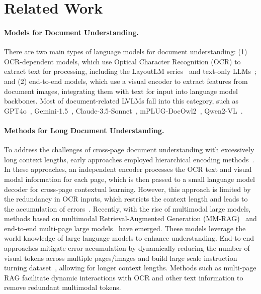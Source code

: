 \section{Related Work}
\label{sec:related_work}

\paragraph{Models for Document Understanding.}
There are two main types of language models for document understanding: (1) OCR-dependent models, which use Optical Character Recognition (OCR) to extract text for processing, including the LayoutLM series~\cite{LayoutLMv1, LayoutLMv2, LayoutLMv3} and text-only LLMs~\cite{Llama3, Qwen2}; and (2) end-to-end models, which use a visual encoder to extract features from document images, integrating them with text for input into language model backbones. Most of document-related LVLMs fall into this category, such as GPT4o~\cite{GPT4o}, Gemini-1.5~\cite{Gemini15}, Claude-3.5-Sonnet~\cite{Claude35Sonnet}, mPLUG-DocOwl2~\cite{mPLUG-DocOwl2}, Qwen2-VL~\cite{Qwen2-VL}.

\paragraph{Methods for Long Document Understanding.}
To address the challenges of cross-page document understanding with excessively long context lengths, early approaches employed hierarchical encoding methods~\cite{MP-DocVQA,MPDoc-SAS,UVL-TG,MPDoc-RMT}. In these approaches, an independent encoder processes the OCR text and visual modal information for each page, which is then passed to a small language model decoder for cross-page contextual learning. However, this approach is limited by the redundancy in OCR inputs, which restricts the context length and leads to the accumulation of errors~\cite{LayoutLMv1,LayoutLMv2,DocFormer}. Recently, with the rise of multimodal large models, methods based on multimodal Retrieval-Augmented Generation (MM-RAG)~\cite{VisRAG,GRAM,MMVQA,CFRet-DVQA,CREAM,M3DocRAG} and end-to-end multi-page large models~\cite{MANTIS,LLaVA-Next-Interleave,Leopard} have emerged. These models leverage the world knowledge of large language models to enhance understanding. End-to-end approaches mitigate error accumulation by dynamically reducing the number of visual tokens across multiple pages/images and build large scale instruction turning dataset~\cite{MANTIS,LLaVA-Next-Interleave,Leopard,mPLUG-DocOwl2}, allowing for longer context lengths. Methods such as multi-page RAG facilitate dynamic interactions with OCR and other text information to remove redundant multimodal tokens.

